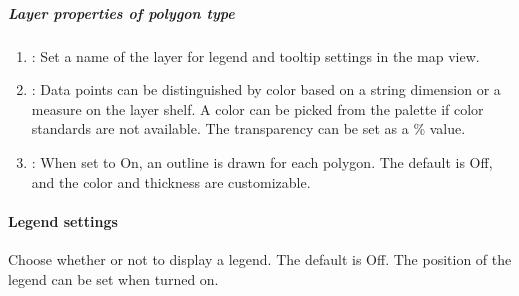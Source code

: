 \documentclass[letterpaper,10pt,english]{sphinxmanual}
\begin{document}
\subparagraph{Layer properties of polygon type}
\label{\detokenize{discovery/part04/map_chart:polygon}}\begin{quote}

\begin{figure}[H]
\centering

\noindent{}
\end{figure}
\end{quote}
\begin{enumerate}
\def\theenumi{\arabic{enumi}}
\def\labelenumi{\theenumi .}
\makeatletter\def\p@enumii{\p@enumi \theenumi .}\makeatother
\item {} 
: Set a name of the layer for legend and tooltip settings in the map view.

\item {} 
: Data points can be distinguished by color based on a string dimension or a measure on the layer shelf. A color can be picked from the palette if color standards are not available. The transparency can be set as a \% value.

\item {} 
: When set to On, an outline is drawn for each polygon. The default is Off, and the color and thickness are customizable.

\end{enumerate}


\paragraph{Legend settings}
\label{\detokenize{discovery/part04/map_chart:id8}}
Choose whether or not to display a legend. The default is Off. The position of the legend can be set when turned on.
\begin{quote}

\begin{figure}[H]
\centering

\noindent{}
\end{figure}
\end{quote}
\end{document}
